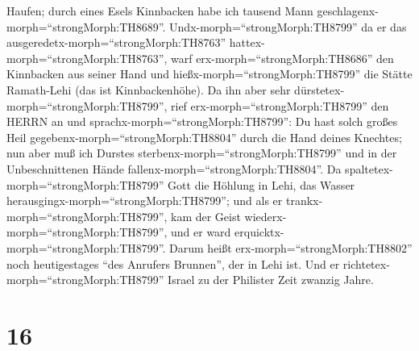Haufen; durch eines Esels Kinnbacken habe ich tausend Mann
geschlagenx-morph=``strongMorph:TH8689''. 
Undx-morph=``strongMorph:TH8799'' da er das
ausgeredetx-morph=``strongMorph:TH8763''
hattex-morph=``strongMorph:TH8763'', warf
erx-morph=``strongMorph:TH8686'' den Kinnbacken aus seiner Hand und
hießx-morph=``strongMorph:TH8799'' die Stätte Ramath-Lehi (das ist
Kinnbackenhöhe).  Da ihn aber sehr
dürstetex-morph=``strongMorph:TH8799'', rief
erx-morph=``strongMorph:TH8799'' den HERRN an und
sprachx-morph=``strongMorph:TH8799'': Du hast solch großes Heil
gegebenx-morph=``strongMorph:TH8804'' durch die Hand deines Knechtes;
nun aber muß ich Durstes sterbenx-morph=``strongMorph:TH8799'' und in
der Unbeschnittenen Hände fallenx-morph=``strongMorph:TH8804''.
 Da spaltetex-morph=``strongMorph:TH8799'' Gott die Höhlung
in Lehi, das Wasser herausgingx-morph=``strongMorph:TH8799''; und als er
trankx-morph=``strongMorph:TH8799'', kam der Geist
wiederx-morph=``strongMorph:TH8799'', und er ward
erquicktx-morph=``strongMorph:TH8799''. Darum heißt
erx-morph=``strongMorph:TH8802'' noch heutigestages ``des Anrufers
Brunnen'', der in Lehi ist.  Und er
richtetex-morph=``strongMorph:TH8799'' Israel zu der Philister Zeit
zwanzig Jahre.

\hypertarget{section-15}{%
\section{16}\label{section-15}}

